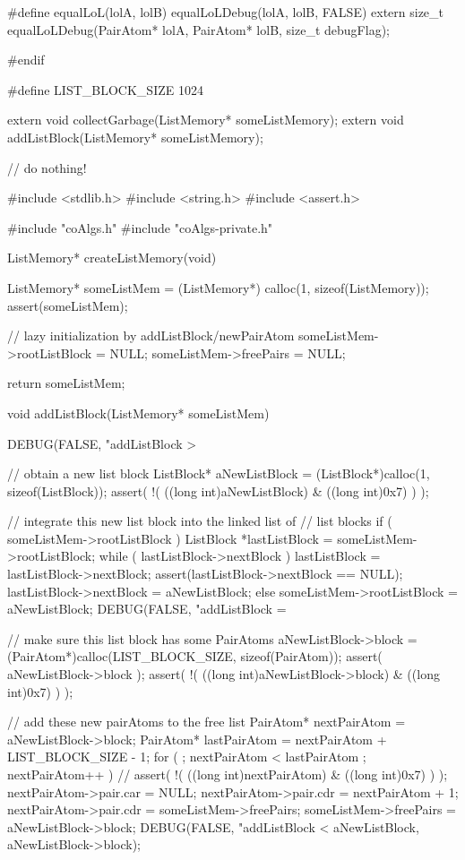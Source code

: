 #define equalLoL(lolA, lolB) equalLoLDebug(lolA, lolB, FALSE)
extern size_t equalLoLDebug(PairAtom* lolA, PairAtom* lolB, size_t debugFlag);

#endif
\stopCHeader

\startCHeader
#define LIST_BLOCK_SIZE 1024

extern void collectGarbage(ListMemory* someListMemory);
extern void addListBlock(ListMemory* someListMemory);
\stopCHeader

\startCCode
// do nothing!
\stopCCode

\startCCode
#include <stdlib.h>
#include <string.h>
#include <assert.h>

#include "coAlgs.h"
#include "coAlgs-private.h"

ListMemory* createListMemory(void) {
  ListMemory* someListMem = (ListMemory*) calloc(1, sizeof(ListMemory));
  assert(someListMem);

  // lazy initialization by addListBlock/newPairAtom
  someListMem->rootListBlock = NULL;
  someListMem->freePairs     = NULL;

  return someListMem;
}

void addListBlock(ListMemory* someListMem) {
  DEBUG(FALSE, "addListBlock > %

  // obtain a new list block
  ListBlock* aNewListBlock = (ListBlock*)calloc(1, sizeof(ListBlock));
  assert( !( ((long int)aNewListBlock) & ((long int)0x7) ) );

  // integrate this new list block into the linked list of
  // list blocks
  if ( someListMem->rootListBlock ) {
    ListBlock *lastListBlock = someListMem->rootListBlock;
    while ( lastListBlock->nextBlock ) {
      lastListBlock = lastListBlock->nextBlock;
    }
    assert(lastListBlock->nextBlock == NULL);
    lastListBlock->nextBlock = aNewListBlock;
  } else {
    someListMem->rootListBlock = aNewListBlock;
  }
  DEBUG(FALSE, "addListBlock = %

  // make sure this list block has some PairAtoms
  aNewListBlock->block = (PairAtom*)calloc(LIST_BLOCK_SIZE, sizeof(PairAtom));
  assert( aNewListBlock->block );
  assert( !( ((long int)aNewListBlock->block) & ((long int)0x7) ) );

  // add these new pairAtoms to the free list
  PairAtom* nextPairAtom = aNewListBlock->block;
  PairAtom* lastPairAtom = nextPairAtom + LIST_BLOCK_SIZE - 1;
  for ( ; nextPairAtom < lastPairAtom ; nextPairAtom++ ) {
//    assert( !( ((long int)nextPairAtom) & ((long int)0x7) ) );
    nextPairAtom->pair.car = NULL;
    nextPairAtom->pair.cdr = nextPairAtom + 1;
  }
  nextPairAtom->pair.cdr = someListMem->freePairs;
  someListMem->freePairs = aNewListBlock->block;
  DEBUG(FALSE, "addListBlock < %
        aNewListBlock, aNewListBlock->block);
}

